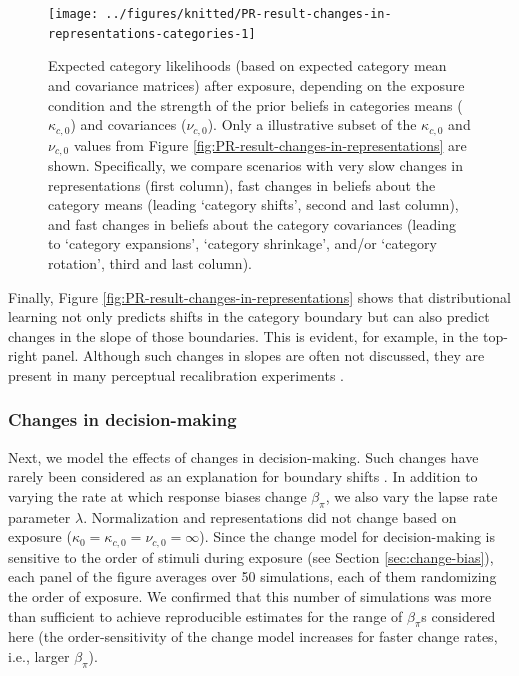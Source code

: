 \documentclass[
  11pt,
  man,floatsintext]{apa6}
\begin{document}
\begin{figure}

{\centering \texttt{[image: ../figures/knitted/PR-result-changes-in-representations-categories-1]} 

}

\caption{Expected category likelihoods (based on expected category mean and covariance matrices) after exposure, depending on the exposure condition and the strength of the prior beliefs in categories means (\(\kappa_{c,0}\)) and covariances (\(\nu_{c,0}\)). Only a illustrative subset of the \(\kappa_{c,0}\) and \(\nu_{c,0}\) values from Figure \ref{fig:PR-result-changes-in-representations} are shown. Specifically, we compare scenarios with very slow changes in representations (first column), fast changes in beliefs about the category means (leading `category shifts', second and last column), and fast changes in beliefs about the category covariances (leading to `category expansions', `category shrinkage', and/or `category rotation', third and last column).}\label{fig:PR-result-changes-in-representations-categories}
\end{figure}

Finally, Figure \ref{fig:PR-result-changes-in-representations} shows that distributional learning not only predicts shifts in the category boundary but can also predict changes in the slope of those boundaries. This is evident, for example, in the top-right panel. Although such changes in slopes are often not discussed, they are present in many perceptual recalibration experiments \autocites[e.g.,][]{drouin2016,liu-jaeger2018,liu-jaeger2019,myers-mesite2014}.

\hypertarget{changes-in-decision-making}{%
\subsubsection{Changes in decision-making}\label{changes-in-decision-making}}

Next, we model the effects of changes in decision-making. Such changes have rarely been considered as an explanation for boundary shifts \autocite[but see][]{clarkedavidson2008}. In addition to varying the rate at which response biases change \(\beta_{\pi}\), we also vary the lapse rate parameter \(\lambda\). Normalization and representations did not change based on exposure (\(\kappa_0 = \kappa_{c,0} = \nu_{c,0} = \infty\)). Since the change model for decision-making is sensitive to the order of stimuli during exposure (see Section \ref{sec:change-bias}), each panel of the figure averages over 50 simulations, each of them randomizing the order of exposure. We confirmed that this number of simulations was more than sufficient to achieve reproducible estimates for the range of \(\beta_{\pi}\)s considered here (the order-sensitivity of the change model increases for faster change rates, i.e., larger \(\beta_{\pi}\)).
\end{document}
